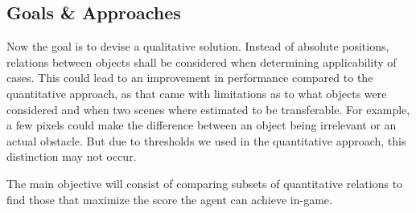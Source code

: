 \subsection{Goals \& Approaches}

Now the goal is to devise a qualitative solution.
Instead of absolute positions, relations between objects shall be considered when determining applicability of cases.
This could lead to an improvement in performance compared to the quantitative approach, as that came with limitations as to what objects were considered and when two scenes where estimated to be transferable. %
For example, a few pixels could make the difference between an object being irrelevant or an actual obstacle.
But due to thresholds we used in the quantitative approach, this distinction may not occur. %

The main objective will consist of comparing subsets of quantitative relations to find those that maximize the score the agent can achieve in-game. %


